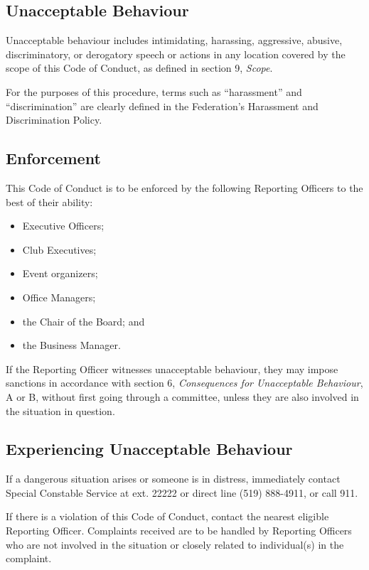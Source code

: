 \subsection{Unacceptable Behaviour}
Unacceptable behaviour includes intimidating, harassing, aggressive, abusive, discriminatory, or derogatory speech or actions in any location covered by the scope of this Code of Conduct, as defined in section 9, \textit{Scope}.

For the purposes of this procedure, terms such as ``harassment'' and ``discrimination'' are clearly defined in the Federation's Harassment and Discrimination Policy.

\subsection{Enforcement}
This Code of Conduct is to be enforced by the following Reporting Officers to the best of their ability:
\begin{itemize}
	\item Executive Officers;
	\item Club Executives;
	\item Event organizers; 
	\item Office Managers;
	\item the Chair of the Board; and
	\item the Business Manager.
\end{itemize}
If the Reporting Officer witnesses unacceptable behaviour, they may impose sanctions in accordance with section 6, \textit{Consequences for Unacceptable Behaviour}, A or B, without first going through a committee, unless they are also involved in the situation in question.

\subsection{Experiencing Unacceptable Behaviour}
If a dangerous situation arises or someone is in distress, immediately contact Special Constable Service at ext. 22222 or direct line (519) 888-4911, or call 911.

If there is a violation of this Code of Conduct, contact the nearest eligible Reporting Officer. Complaints received are to be handled by Reporting Officers who are not involved in the situation or closely related to individual(s) in the complaint.

